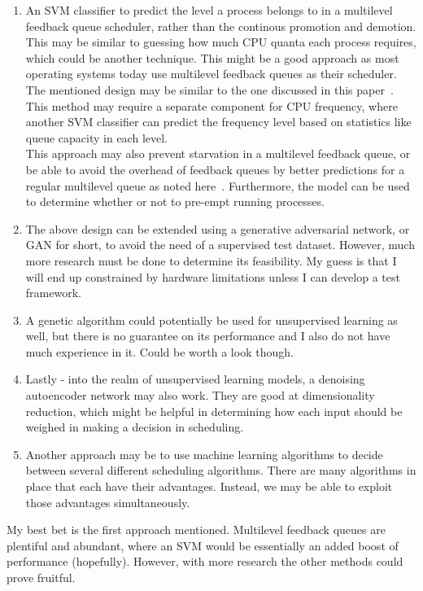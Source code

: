 \documentclass[12pt]{article}
\begin{document}
\begin{enumerate}
    \item An SVM classifier to predict the level a process belongs to in a multilevel feedback queue scheduler, rather than the continous promotion and demotion. This may be similar to guessing how much CPU quanta each process requires, which could be another technique. This might be a good approach as most operating systems today use multilevel feedback queues as their scheduler. The mentioned design may be similar to the one discussed in this paper~\cite{satyanarayanaImprovedProcessScheduling2018}. This method may require a separate component for CPU frequency, where another SVM classifier can predict the frequency level based on statistics like queue capacity in each level. \\
    This approach may also prevent starvation in a multilevel feedback queue, or be able to avoid the overhead of feedback queues by better predictions for a regular multilevel queue as noted here~\cite{DifferenceMultilevelQueue2020}. Furthermore, the model can be used to determine whether or not to pre-empt running processes.
    \item The above design can be extended using a generative adversarial network, or GAN for short, to avoid the need of a supervised test dataset. However, much more research must be done to determine its feasibility. My guess is that I will end up constrained by hardware limitations unless I can develop a test framework.
    \item A genetic algorithm could potentially be used for unsupervised learning as well, but there is no guarantee on its performance and I also do not have much experience in it. Could be worth a look though.
    \item Lastly - into the realm of unsupervised learning models, a denoising autoencoder network may also work. They are good at dimensionality reduction, which might be helpful in determining how each input should be weighed in making a decision in scheduling.
    \item Another approach may be to use machine learning algorithms to decide between several different scheduling algorithms. There are many algorithms in place that each have their advantages. Instead, we may be able to exploit those advantages simultaneously.
\end{enumerate}

My best bet is the first approach mentioned. Multilevel feedback queues are plentiful and abundant, where an SVM would be essentially an added boost of performance (hopefully). However, with more research the other methods could prove fruitful. 
\end{document}
